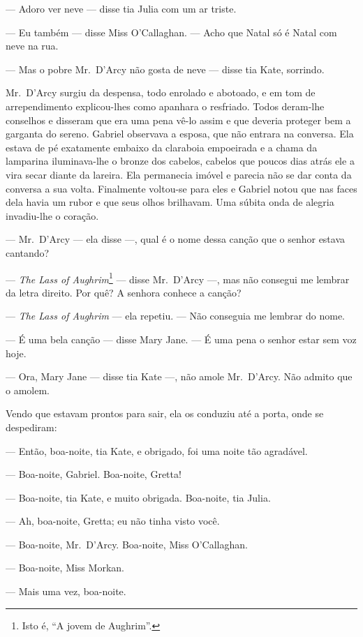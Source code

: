 --- Adoro ver neve --- disse tia Julia com um ar triste.

--- Eu também --- disse Miss O’Callaghan.  --- Acho que Natal só é Natal com
neve na rua.

--- Mas o pobre Mr.~D’Arcy não gosta de neve --- disse tia Kate, sorrindo.

Mr.~D’Arcy surgiu da despensa, todo enrolado e abotoado, e em tom de
arrependimento explicou-lhes como apanhara o resfriado.  Todos deram-lhe
conselhos e disseram que era uma pena vê-lo assim e que deveria proteger bem a
garganta do sereno.  Gabriel observava a esposa, que não entrara na conversa.
Ela estava de pé exatamente embaixo da claraboia empoeirada e a chama da
lamparina iluminava-lhe o bronze dos cabelos, cabelos que poucos dias atrás ele
a vira secar diante da lareira.  Ela permanecia imóvel e parecia não se dar
conta da conversa a sua volta.  Finalmente voltou-se para eles e Gabriel notou
que nas faces dela havia um rubor e que seus olhos brilhavam.  Uma súbita onda
de alegria invadiu-lhe o coração.

--- Mr.~D’Arcy --- ela disse ---, qual é o nome dessa canção que o senhor
estava cantando?

--- \textit{The Lass of Aughrim}\footnote{ Isto é, “A jovem de Aughrim”.} 
--- disse Mr.~D’Arcy ---, mas não consegui me lembrar da letra direito.  Por
quê? A senhora conhece a canção?

--- \textit{The Lass of Aughrim} --- ela repetiu.  --- Não conseguia me lembrar
do nome.

--- É uma bela canção --- disse Mary Jane.  --- É uma pena o senhor estar sem
voz hoje.

--- Ora, Mary Jane --- disse tia Kate ---, não amole Mr.~D’Arcy.  Não admito
que o amolem.

Vendo que estavam prontos para sair, ela os conduziu até a porta, onde se
despediram:

--- Então, boa-noite, tia Kate, e obrigado, foi uma noite tão agradável.

--- Boa-noite, Gabriel.  Boa-noite, Gretta!

--- Boa-noite, tia Kate, e muito obrigada.  Boa-noite, tia Julia.

--- Ah, boa-noite, Gretta; eu não tinha visto você.

--- Boa-noite, Mr.~D’Arcy.  Boa-noite, Miss O’Callaghan.

--- Boa-noite, Miss Morkan.

--- Mais uma vez, boa-noite.

